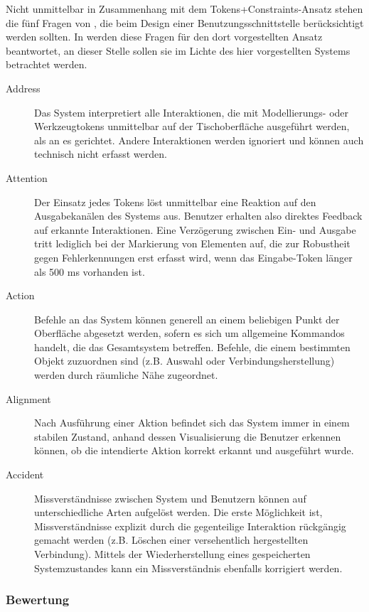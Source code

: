 Nicht unmittelbar in Zusammenhang mit dem Tokens+Constraints-Ansatz stehen die fünf Fragen von \citet{Bellotti02}, die beim Design einer Benutzungsschnittstelle berücksichtigt werden sollten. In \citet{Ullmer05} werden diese Fragen für den dort vorgestellten Ansatz beantwortet, an dieser Stelle sollen sie im Lichte des hier vorgestellten Systems betrachtet werden.

\begin{description}
	\item[Address] Das System interpretiert alle Interaktionen, die mit Modellierungs- oder Werkzeugtokens unmittelbar auf der Tischoberfläche ausgeführt werden, als an es gerichtet. Andere Interaktionen werden ignoriert und können auch technisch nicht erfasst werden.
	\item[Attention] Der Einsatz jedes Tokens löst unmittelbar eine Reaktion auf den Ausgabekanälen des Systems aus. Benutzer erhalten also direktes Feedback auf erkannte Interaktionen. Eine Verzögerung zwischen Ein- und Ausgabe tritt lediglich bei der Markierung von Elementen auf, die zur Robustheit gegen Fehlerkennungen erst erfasst wird, wenn das  Eingabe-Token länger als 500 ms vorhanden ist.
	\item[Action] Befehle an das System können generell an einem beliebigen Punkt der Oberfläche abgesetzt werden, sofern es sich um allgemeine Kommandos handelt, die das Gesamtsystem betreffen. Befehle, die einem bestimmten Objekt zuzuordnen sind (z.B. Auswahl oder Verbindungsherstellung) werden durch räumliche Nähe zugeordnet.
	\item[Alignment] Nach Ausführung einer Aktion befindet sich das System immer in einem stabilen Zustand, anhand dessen Visualisierung die Benutzer erkennen können, ob die intendierte Aktion korrekt erkannt und ausgeführt wurde.
	\item[Accident] Missverständnisse zwischen System und Benutzern können auf unterschiedliche Arten aufgelöst werden. Die erste Möglichkeit ist, Missverständnisse explizit durch die gegenteilige Interaktion rückgängig gemacht werden (z.B. Löschen einer versehentlich hergestellten Verbindung). Mittels der Wiederherstellung eines gespeicherten Systemzustandes kann ein Missverständnis ebenfalls korrigiert werden.
\end{description}

\subsubsection{Bewertung}

